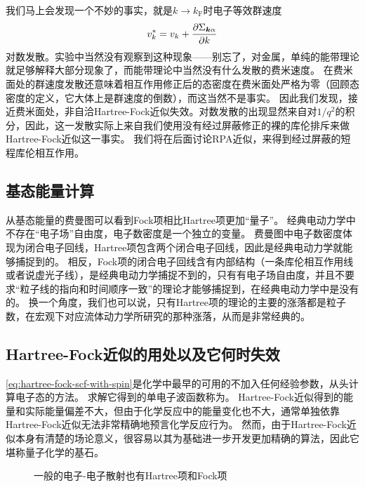 我们马上会发现一个不妙的事实，就是$k \to k_\text{F}$时电子等效群速度
\begin{equation}
    v^*_k = v_k + \pdv{\Sigma_{\vb*{k} \alpha}}{k}
\end{equation}
对数发散。实验中当然没有观察到这种现象——别忘了，对金属，单纯的能带理论就足够解释大部分现象了，而能带理论中当然没有什么发散的费米速度。
在费米面处的群速度发散还意味着相互作用修正后的态密度在费米面处严格为零（回顾态密度的定义，它大体上是群速度的倒数），而这当然不是事实。
因此我们发现，接近费米面处，非自洽Hartree-Fock近似失效。对数发散的出现显然来自对$1 / q^2$的积分，因此，这一发散实际上来自我们使用没有经过屏蔽修正的裸的库伦排斥来做Hartree-Fock近似这一事实。
我们将在后面讨论RPA近似，来得到经过屏蔽的短程库伦相互作用。

\subsection{基态能量计算}

从基态能量的费曼图可以看到Fock项相比Hartree项更加“量子”。
经典电动力学中不存在“电子场”自由度，电子数密度是一个独立的变量。
费曼图中电子数密度体现为闭合电子回线，Hartree项包含两个闭合电子回线，因此是经典电动力学就能够捕捉到的。
相反，Fock项的闭合电子回线含有内部结构（一条库伦相互作用线或者说虚光子线），是经典电动力学捕捉不到的，只有有电子场自由度，并且不要求“粒子线的指向和时间顺序一致”的理论才能够捕捉到，在经典电动力学中是没有的。
换一个角度，我们也可以说，只有Hartree项的理论的主要的涨落都是粒子数，在宏观下对应流体动力学所研究的那种涨落，从而是非常经典的。

\subsection{Hartree-Fock近似的用处以及它何时失效}\label{sec:hf-success-failure}

\eqref{eq:hartree-fock-scf-with-spin}是化学中最早的可用的不加入任何经验参数，从头计算电子态的方法。
求解它得到的单电子波函数称为。
Hartree-Fock近似得到的能量和实际能量偏差不大，但由于化学反应中的能量变化也不大，通常单独依靠Hartree-Fock近似无法非常精确地预言化学反应行为。
然而，由于Hartree-Fock近似本身有清楚的场论意义，很容易以其为基础进一步开发更加精确的算法，因此它堪称量子化学的基石。

\begin{figure}
    \centering
    
    \caption{一般的电子-电子散射也有Hartree项和Fock项}
    \label{fig:generalized-hartree-fock}
\end{figure}

